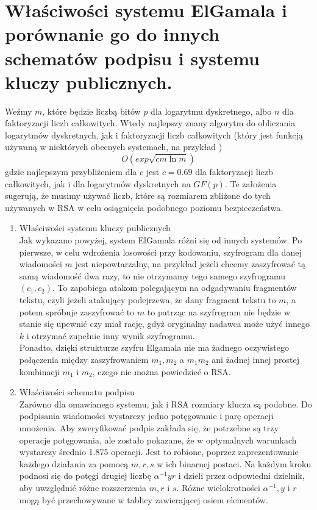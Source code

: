 \documentclass[12pt,a4paper]{article}
\begin{document}
\section{Właściwości systemu ElGamala i porównanie go do innych schematów podpisu i systemu kluczy publicznych.}
Weźmy $m$, które będzie liczbą bitów $p$ dla logarytmu dyskretnego, albo $n$ dla faktoryzacji liczb całkowitych. Wtedy najlepszy znany algorytm do obliczania  logarytmów dyskretnych, jak i faktoryzacji liczb całkowitych (który jest funkcją używaną w niektórych obecnych systemach, na przykład )
\[O(exp\sqrt{cm\ln{m}})\]
gdzie najlepszym przybliżeniem dla $c$ jest $c=0.69$ dla faktoryzacji liczb całkowitych, jak i dla logarytmów dyskretnych na $GF(p)$. Te założenia sugerują, że musimy używać liczb, które są rozmiarem zbliżone do tych używanych w RSA w celu osiągnięcia podobnego poziomu bezpieczeństwa.  
\begin{enumerate}
    \item Właściwości systemu kluczy publicznych\\
    Jak wykazano powyżej, system ElGamala różni się od innych systemów. Po pierwsze, w celu wdrożenia losowości przy kodowaniu, szyfrogram dla danej wiadomości $m$ jest niepowtarzalny, na przykład jeżeli chcemy zaszyfrować tą samą wiadomość dwa razy, to nie otrzymamy tego samego szyfrogramu $(c_{1}, c_{2})$. To zapobiega atakom polegającym na odgadywaniu fragmentów tekstu, czyli jeżeli atakujący podejrzewa, że dany fragment tekstu to $m$, a potem spróbuje zaszyfrować to $m$ to patrząc na szyfrogram nie będzie w stanie się upewnić czy miał rację, gdyż oryginalny nadawca może użyć innego $k$ i otrzymać zupełnie inny wynik szyfrogramu. \\
    Ponadto, dzięki strukturze szyfru Elgamala nie ma żadnego oczywistego połączenia między zaszyfrowaniem $m_{1}, m_{2}$ a $m_{1}m_{2}$ ani żadnej innej prostej kombinacji $m_{1}$ i $m_{2}$, czego nie można powiedzieć o RSA.
    \item Właściwości schematu podpisu\\
    Zarówno dla omawianego systemu, jak i RSA rozmiary klucza są podobne. Do podpisania wiadomości wystarczy jedno potęgowanie i parę operacji mnożenia. Aby zweryfikować podpis zakłada się, że potrzebne są trzy operacje potęgowania, ale zostało pokazane, że w optymalnych warunkach wystarczy średnio 1.875 operacji. Jest to robione, poprzez zaprezentowanie każdego działania za pomocą $m, r, s$ w ich binarnej postaci. Na każdym kroku podnosi się do potęgi drugiej liczbę $\alpha^{-1}yr$ i dzieli przez odpowiedni dzielnik, aby uwzględnić różne rozszerzenia $m, r$ i $s$. Różne wielokrotności $\alpha^{-1}, y$ i $r$ mogą być przechowywane w tablicy zawierającej osiem elementów.
    
    
\end{enumerate}
\end{document}
